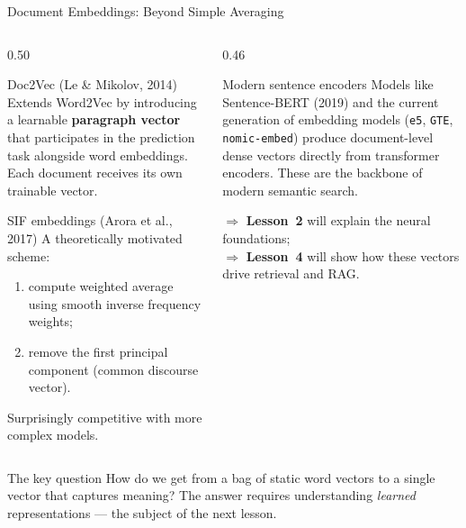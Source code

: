 \documentclass[aspectratio=169]{beamer}
\begin{document}
%
%
\begin{frame}{Document Embeddings: Beyond Simple Averaging}
\small
\begin{columns}[T]
\begin{column}{0.50\textwidth}
\begin{block}{Doc2Vec (Le \& Mikolov, 2014)}
Extends Word2Vec by introducing a learnable \textbf{paragraph vector} that participates
in the prediction task alongside word embeddings. Each document receives its own
trainable vector.
\end{block}

\vspace{0.10cm}
\begin{block}{SIF embeddings (Arora et al., 2017)}
A theoretically motivated scheme:
\begin{enumerate}
    \item compute weighted average using smooth inverse frequency weights;
    \item remove the first principal component (common discourse vector).
\end{enumerate}
Surprisingly competitive with more complex models.
\end{block}
\end{column}
\begin{column}{0.46\textwidth}
\begin{block}{Modern sentence encoders}
Models like Sentence-BERT (2019) and the current generation of embedding models
(\texttt{e5}, \texttt{GTE}, \texttt{nomic-embed}) produce document-level dense vectors
directly from transformer encoders. These are the backbone of modern semantic search.

\vspace{0.10cm}
$\Rightarrow$ \textbf{Lesson~2} will explain the neural foundations;\\
$\Rightarrow$ \textbf{Lesson~4} will show how these vectors drive retrieval and RAG.
\end{block}
\end{column}
\end{columns}

\vspace{0.12cm}
\begin{alertblock}{The key question}
How do we get from a bag of static word vectors to a single vector that captures meaning?
The answer requires understanding \emph{learned} representations --- the subject of the next lesson.
\end{alertblock}
\end{frame}
\end{document}
